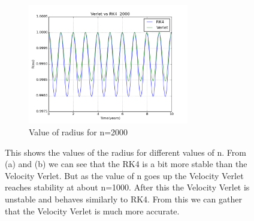 \documentclass[11pt,a4wide]{article}
\begin{document}
\begin{figure}[H]
\begin{subfigure}[b]{0.5\linewidth}
    \centering
    \includegraphics[width=70mm]{2000.png}
    \caption{Value of radius for n=2000} 
    \label{fig7:d} 
    \vspace{4ex}
\end{subfigure}
\caption{This shows the values of the radius for different values of n. From (a) and (b) we can see that the RK4 is a bit more stable than the Velocity Verlet. But as the value of n goes up the Velocity Verlet reaches stability at about n=1000. After this the Velocity Verlet is unstable and behaves similarly to RK4. From this we can gather that the Velocity Verlet is much more accurate.}
\end{figure}

\end{document}
